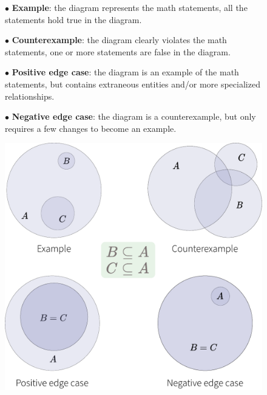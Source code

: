 \vspace{0.5em}
\begin{figure}[h]
\begin{minipage}[b]{0.48\linewidth}
$\bullet$ \textbf{Example}: the diagram represents the math statements, \ie all the statements hold true in the diagram. 
    \vspace{3pt}
    
$\bullet$ \textbf{Counterexample}: the diagram clearly violates the math statements, \ie one or more statements are false in the diagram.
    \vspace{3pt}
    
$\bullet$ \textbf{Positive edge case}: the diagram is an example of the math statements, but contains extraneous entities and/or more specialized relationships. 
    \vspace{3pt}
    
$\bullet$ \textbf{Negative edge case}: the diagram is a counterexample, but only requires a few changes to become an example.
\end{minipage}
\hfill
\begin{minipage}[b]{0.45\linewidth}
    \centering
    \includegraphics[width=\textwidth]{assets/appendix/definitions-examples.pdf}
\end{minipage}
\end{figure}

